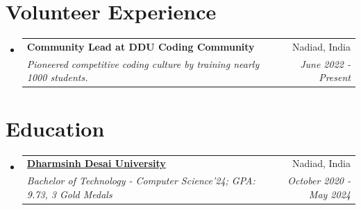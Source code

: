 \documentclass[a4paper,10pt]{article}
\makeatletter
\newcommand{\resumeSubheadingFull}[4]{
  \vspace{-1pt}\item
    \begin{tabular*}{0.97\textwidth}{l@{\extracolsep{\fill}}r}
    \textbf{#1} & #2 \\
    \textit{#3} & \textit{#4} \\
    \end{tabular*}\vspace{-5pt}
}
\newcommand{\resumeSubHeadingListStart}{\begin{itemize}[leftmargin=*]}
\newcommand{\resumeSubHeadingListEnd}{\end{itemize}}
\makeatother
\begin{document}
\section{Volunteer Experience}
  \resumeSubHeadingListStart
	\resumeSubheadingFull
    {Community Lead at DDU Coding Community}{Nadiad, India}
    {Pioneered competitive coding culture by training nearly 1000 students.}{June 2022 - Present}
\vspace{2pt}
\resumeSubHeadingListEnd

\section{Education}
  \resumeSubHeadingListStart
    \resumeSubheadingFull
      {\href{https://www.ddu.ac.in/}{Dharmsinh Desai University}}{Nadiad, India}
      {Bachelor of Technology - Computer Science'24;  GPA: 9.73, 3 Gold Medals}{October 2020 - May 2024}
    \resumeSubHeadingListEnd	    
\end{document}
